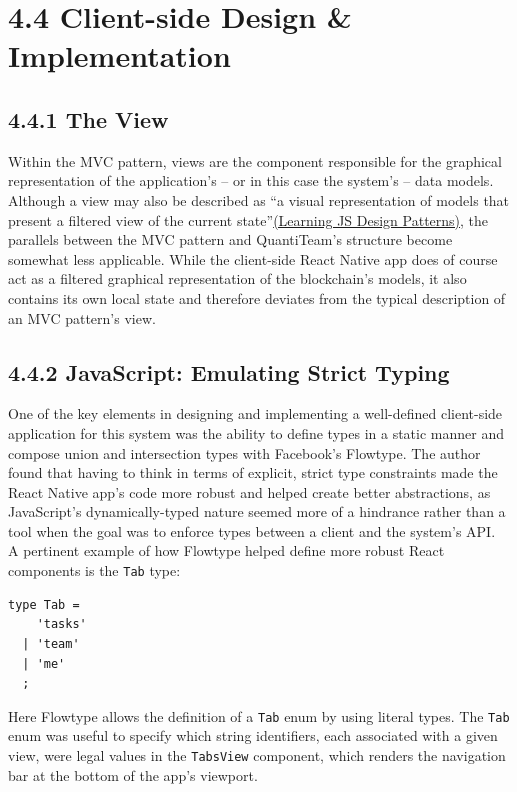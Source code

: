 \documentclass[12pt]{report}
\begin{document}
\section{4.4 Client-side Design \&
Implementation}\label{client-side-design-implementation}

\subsection{4.4.1 The View}\label{the-view}

Within the MVC pattern, views are the component responsible for the
graphical representation of the application's -- or in this case the
system's -- data
models\cite{krasner1988description}.
Although a view may also be described as ``a visual representation of
models that present a filtered view of the current
state''\href{https://addyosmani.com/resources/essentialjsdesignpatterns/book/\#detailmvc}{(Learning
JS Design Patterns)}, the parallels between the MVC pattern and
QuantiTeam's structure become somewhat less applicable. While the
client-side React Native app does of course act as a filtered graphical
representation of the blockchain's models, it also contains its own
local state and therefore deviates from the typical description of an
MVC pattern's view.

\subsection{4.4.2 JavaScript: Emulating Strict
Typing}\label{javascript-emulating-strict-typing}

One of the key elements in designing and implementing a well-defined
client-side application for this system was the ability to define types
in a static manner and compose union and intersection types with
Facebook's Flowtype. The author found that having to think in terms of
explicit, strict type constraints made the React Native app's code more
robust and helped create better abstractions, as JavaScript's
dynamically-typed nature seemed more of a hindrance rather than a tool
when the goal was to enforce types between a client and the system's
API.\\
A pertinent example of how Flowtype helped define more robust React
components is the \texttt{Tab} type:

\begin{verbatim}
type Tab =
    'tasks'
  | 'team'
  | 'me'
  ;
\end{verbatim}

Here Flowtype allows the definition of a \texttt{Tab} enum by using
literal
types\cite{1flowtype}. The \texttt{Tab} enum was useful to specify which string
identifiers, each associated with a given view, were legal values in the
\texttt{TabsView} component, which renders the navigation bar at the
bottom of the app's viewport.
\end{document}
